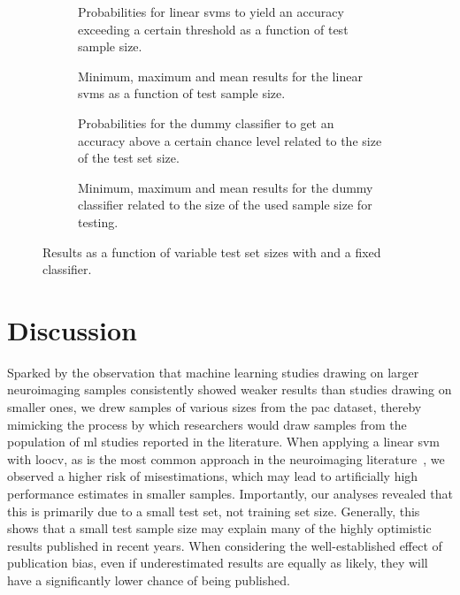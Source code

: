 \documentclass[12pt,a4paper]{article}
\begin{document}
    \begin{figure}
        \captionsetup[subfigure]{justification=justified,singlelinecheck=false}
        \begin{subfigure}[t]{0.61\textwidth}
            
            \caption{Probabilities for linear \acp{svm} to yield an accuracy exceeding a certain threshold as a function of test sample size.}
        \end{subfigure}
        \hspace{3.0mm}
        \begin{subfigure}[t]{0.34\textwidth}
            
            \caption{Minimum, maximum and mean results for the linear \acp{svm} as a function of test sample size.}
        \end{subfigure}

        \vspace{3.0mm}

        \begin{subfigure}[t]{0.61\textwidth}
            
            \caption{Probabilities for the dummy classifier to get an accuracy above a certain chance level related to the size of the test set size.}
        \end{subfigure}
        \hspace{3.0mm}
        \begin{subfigure}[t]{0.34\textwidth}
            
            \caption{Minimum, maximum and mean results for the dummy classifier related to the size of the used sample size for testing.}
        \end{subfigure}
        \caption{Results as a function of variable test set sizes with and a fixed classifier.}
        \label{fig:test_sample_size_effects}
    \end{figure}


    \section{Discussion}
Sparked by the observation that machine learning studies drawing on larger neuroimaging samples consistently showed weaker results than studies drawing on smaller ones, we drew samples of various sizes from the \ac{pac} dataset, thereby mimicking the process by which researchers would draw samples from the population of \ac{ml} studies reported in the literature. When applying a linear \ac{svm} with \ac{loocv}, as is the most common approach in the neuroimaging literature~\cite{Arbabshirani2017}, we observed a higher risk of misestimations, which may lead to artificially high performance estimates in smaller samples. Importantly, our analyses revealed that this is primarily due to a small test set, not training set size. Generally, this shows that a small test sample size may explain many of the highly optimistic results published in recent years. When considering the well-established effect of publication bias, even if underestimated results are equally as likely, they will have a significantly lower chance of being published.
\end{document}
